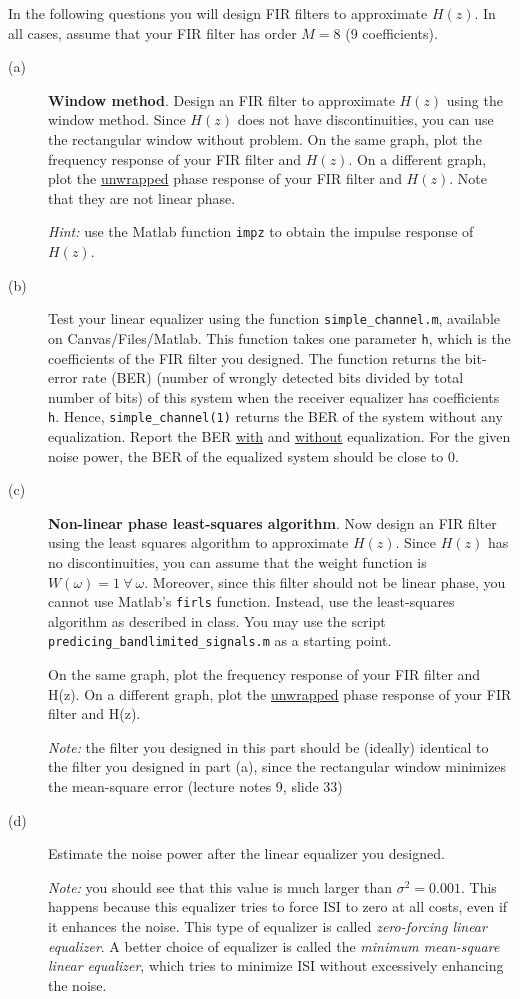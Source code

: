 \documentclass[12pt]{report}
\begin{document}
In the following questions you will design FIR filters to approximate $H(z)$. In all cases, assume that your FIR filter has order $M = 8$ (9 coefficients).
\begin{description}
	\item[(a)] \textbf{Window method}. Design an FIR filter to approximate $H(z)$ using the window method. Since $H(z)$ does not have discontinuities, you can use the rectangular window without problem. On the same graph, plot the frequency response of your FIR filter and $H(z)$. On a different graph, plot the \underline{unwrapped} phase response of your FIR filter and $H(z)$. Note that they are not linear phase.
	
	\textit{Hint:} use the Matlab function \texttt{impz} to obtain the impulse response of $H(z)$.
			
	\item[(b)] Test your linear equalizer using the function \texttt{simple\_channel.m}, available on Canvas/Files/Matlab. This function takes one parameter \texttt{h}, which is the coefficients of the FIR filter you designed. The function returns the bit-error rate (BER) (number of wrongly detected bits divided by total number of bits) of this system when the receiver equalizer has coefficients \texttt{h}. Hence, \texttt{simple\_channel(1)} returns the BER of the system without any equalization. Report the BER \underline{with} and \underline{without} equalization. For the given noise power, the BER of the equalized system should be close to 0. 
	\item[(c)] \textbf{Non-linear phase least-squares algorithm}. Now design an FIR filter using the least squares algorithm to approximate $H(z)$. Since $H(z)$ has no discontinuities, you can assume that the weight function is $W(\omega) = 1~\forall~\omega$. Moreover, since this filter should not be linear phase, you cannot use Matlab's \texttt{firls} function. Instead, use the least-squares algorithm as described in class. You may use the script \texttt{predicing\_bandlimited\_signals.m} as a starting point.
	
	On the same graph, plot the frequency response of your FIR filter and H(z). On a different graph, plot the \underline{unwrapped} phase response of your FIR filter and H(z).
	
	\textit{Note:} the filter you designed in this part should be (ideally) identical to the filter you designed in part (a), since the rectangular window minimizes the mean-square error (lecture notes 9, slide 33)
	
	\item[(d)] Estimate the noise power after the linear equalizer you designed.
	
	\textit{Note:} you should see that this value is much larger than $\sigma^2 = 0.001$. This happens because this equalizer tries to force ISI to zero at all costs, even if it enhances the noise. This type of equalizer is called \textit{zero-forcing linear equalizer}. A better choice of equalizer is called the \textit{minimum mean-square linear equalizer}, which tries to minimize ISI without excessively enhancing the noise.
	
\end{description}
\end{document}
